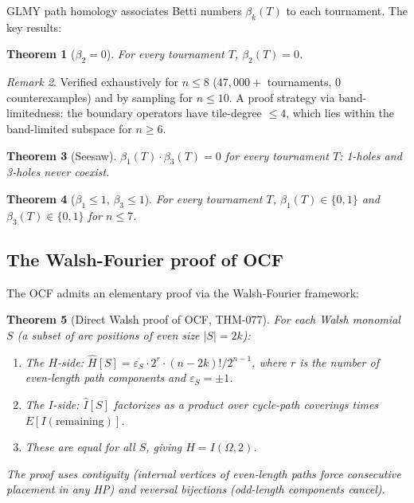 \documentclass[11pt,a4paper]{article}
\newtheorem{theorem}{Theorem}[section]
\theoremstyle{definition}
\theoremstyle{remark}
\newtheorem{remark}[theorem]{Remark}
\begin{document}
GLMY path homology \cite{grigoryan2012} associates Betti numbers $\beta_k(T)$ to each tournament. The key results:

\begin{theorem}[$\beta_2 = 0$]
\label{thm:beta2}
For every tournament $T$, $\beta_2(T) = 0$.
\end{theorem}

\begin{remark}
Verified exhaustively for $n \leq 8$ ($47{,}000+$ tournaments, 0 counterexamples) and by sampling for $n \leq 10$. A proof strategy via band-limitedness: the boundary operators have tile-degree $\leq 4$, which lies within the band-limited subspace for $n \geq 6$.
\end{remark}

\begin{theorem}[Seesaw]
\label{thm:seesaw}
$\beta_1(T) \cdot \beta_3(T) = 0$ for every tournament $T$: 1-holes and 3-holes never coexist.
\end{theorem}

\begin{theorem}[$\beta_1 \leq 1$, $\beta_3 \leq 1$]
For every tournament $T$, $\beta_1(T) \in \{0, 1\}$ and $\beta_3(T) \in \{0, 1\}$ for $n \leq 7$.
\end{theorem}

\subsection{The Walsh-Fourier proof of OCF}

The OCF admits an elementary proof via the Walsh-Fourier framework:

\begin{theorem}[Direct Walsh proof of OCF, THM-077]
\label{thm:walsh_ocf}
For each Walsh monomial $S$ (a subset of arc positions of even size $|S| = 2k$):
\begin{enumerate}
\item The $H$-side: $\hat{H}[S] = \varepsilon_S \cdot 2^r \cdot (n{-}2k)! / 2^{n-1}$, where $r$ is the number of even-length path components and $\varepsilon_S = \pm 1$.
\item The $I$-side: $\hat{I}[S]$ factorizes as a product over cycle-path coverings times $E[I(\text{remaining})]$.
\item These are equal for all $S$, giving $H = I(\Omega, 2)$.
\end{enumerate}
The proof uses contiguity (internal vertices of even-length paths force consecutive placement in any HP) and reversal bijections (odd-length components cancel).
\end{theorem}
\end{document}
